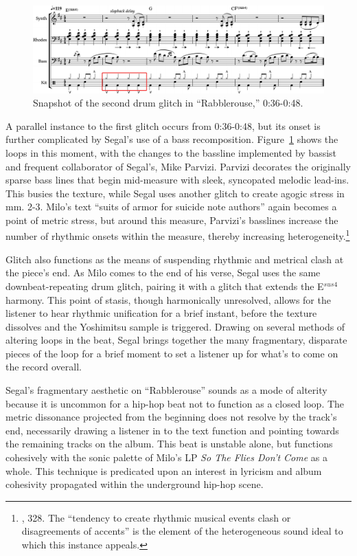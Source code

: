     \begin{figure}[ht]
        \centering
        \includegraphics[width=\textwidth]{images/figures/chp 02/036048rabblesecondglitch.pdf}
        \caption{Snapshot of the second drum glitch in ``Rabblerouse,'' 0:36-0:48.}
        \label{fig:rabblesecondglitch}
    \end{figure}

A parallel instance to the first glitch occurs from 0:36-0:48, but its onset is further complicated
by Segal's use of a bass recomposition. Figure~\ref{fig:rabblesecondglitch} shows the loops in this 
moment, with the changes to the bassline implemented by bassist and frequent collaborator of Segal's, 
Mike Parvizi. Parvizi decorates the originally sparse bass lines that begin mid-measure with sleek,
syncopated melodic lead-ins. This busies the texture, while Segal uses another glitch to create agogic 
stress in mm. 2-3. Milo's text \textemdash  ``suits of armor for suicide note authors'' \textemdash again
becomes a point of metric stress, but around this measure, Parvizi's basslines increase the number of
rhythmic onsets within the measure, thereby increasing 
heterogeneity.\footnote{\cite{ollywilsonHeterogeneousSoundIdeal1992}, 328. The ``tendency to create 
rhythmic musical events clash or disagreements of accents'' is the element of the heterogeneous sound 
ideal to which this instance appeals.}

Glitch also functions as the means of suspending rhythmic and metrical clash at the piece's end. As Milo
comes to the end of his verse, Segal uses the same downbeat-repeating drum glitch, pairing it with a 
glitch that extends the E$^{sus4}$ harmony. This point of stasis, though harmonically unresolved, allows
for the listener to hear rhythmic unification for a brief instant, before the texture dissolves and the
Yoshimitsu sample is triggered. Drawing on several methods of altering loops in the beat, Segal brings
together the many fragmentary, disparate pieces of the loop for a brief moment to set a listener up for
what's to come on the record overall.

Segal's fragmentary aesthetic on ``Rabblerouse'' sounds as a mode of alterity because it is uncommon for
a hip-hop beat not to function as a closed loop. The metric dissonance projected from the beginning does
not resolve by the track's end, necessarily drawing a listener in to the text function and pointing 
towards the remaining tracks on the album. This beat is unstable alone, but functions cohesively with 
the sonic palette of Milo's LP \textit{So The Flies Don't Come} as a whole. This technique is predicated 
upon an interest in lyricism and album cohesivity propagated within the underground hip-hop scene.

